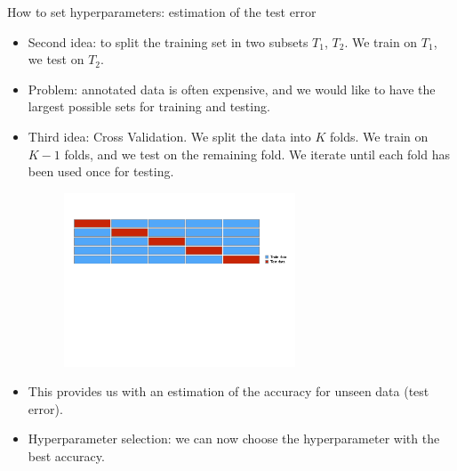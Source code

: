 \documentclass[xcolor=pdftex,dvipsnames,table]{beamer}
\begin{document}
\begin{frame}{How to set hyperparameters: estimation of the test error}
	\begin{itemize}
		\item<1-> Second idea: to split the training set in two subsets $T_1$, $T_2$. We train on $T_1$, we test on $T_2$.
		\item<2-> Problem: annotated data is often expensive, and we would like to have the largest possible sets for training and testing.
		\item<3-> Third idea: Cross Validation. We split the data into $K$ folds. We train on $K-1$ folds, and we test on the remaining fold. We iterate until each fold has been used once for testing.
		\begin{figure}[htb]
			\includegraphics[width=0.65\textwidth]{../graphics/CV1.pdf}
		\end{figure}
		\item<4-> This provides us with an estimation of the accuracy for unseen data (test error).
		\item<5-> Hyperparameter selection: we can now choose the hyperparameter with the best accuracy.
	\end{itemize}
\end{frame}
\end{document}
